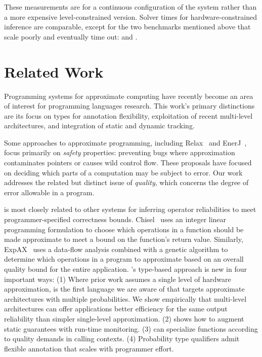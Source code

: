 {These measurements are for a continuous configuration of the system rather
than a more expensive level-constrained version.
Solver times for hardware-constrained inference are comparable, except for the
two benchmarks mentioned above that scale poorly and eventually time out:
 and .




\section{Related Work}

Programming systems for approximate computing have recently become an area of
interest for programming languages research.
This work's primary distinctions are its focus on types for annotation
flexibility,
exploitation of recent multi-level architectures,
and integration of static and dynamic tracking.

Some approaches to approximate programming, including Relax~\cite{relax}
and EnerJ~\cite{enerj}, focus primarily on \emph{safety} properties:
preventing bugs where approximation contaminates pointers or causes wild
control flow.
These proposals have focused on deciding which parts of a computation may be
subject to error.
Our work addresses the related but distinct issue of \emph{quality}, which
concerns the degree of error allowable in a program.

\lang is most closely related to other systems for inferring operator
reliabilities to meet program\-mer-specified correctness bounds.
Chisel~\cite{chisel} uses an integer linear programming formulation
to choose which operations in a function should be made approximate to
meet a bound on the function's return value.
Similarly, ExpAX~\cite{expax-tr} uses a data-flow analysis combined with a
genetic algorithm to determine which operations in a program to approximate
based on an overall quality bound for the entire application.
\lang's type-based approach is new in four important ways:
(1) Where prior work assumes a single level of hardware approximation, \lang
is the first language we are aware of that targets approximate architectures
with multiple probabilities.
We show empirically that multi-level architectures can offer applications
better efficiency for the same output reliability than simpler single-level
approximation.
(2) \lang shows how to augment static guarantees with run-time monitoring.
(3) \lang can specialize functions according to quality demands in calling
contexts.
(4) Probability type qualifiers admit flexible annotation that scales with
programmer effort.

}
